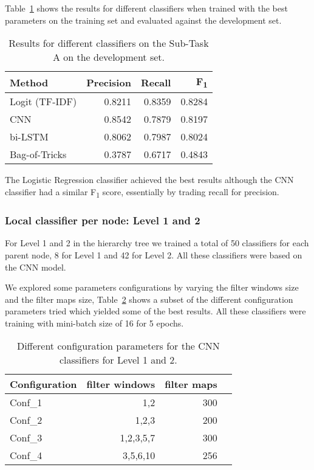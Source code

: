 \documentclass[11pt,a4paper]{article}
\begin{document}
Table~\ref{subtask_a_devset-results} shows the results for different classifiers
when trained with the best parameters on the training set and evaluated against
the development set.

\begin{table}[!h]
\begin{center}
\begin{tabular}{|l|r|r|r|}
\hline\centering\textbf{Method}  & \textbf{Precision} &  \textbf{Recall} &  \textbf{F\textsubscript{1}}\\
\hline
 Logit (TF-IDF) & 0.8211 & 0.8359 & 0.8284 \\
 CNN            & 0.8542 & 0.7879 & 0.8197 \\
 bi-LSTM        & 0.8062 & 0.7987 & 0.8024 \\
 Bag-of-Tricks  & 0.3787 & 0.6717 & 0.4843 \\
\hline
\end{tabular}
\end{center}
\caption{\label{subtask_a_devset-results} Results for different classifiers on the Sub-Task A on the development set.}
\end{table}

The Logistic Regression classifier achieved the best results
although the CNN classifier  had a similar F\textsubscript{1} score, essentially
by trading recall for precision.


\subsubsection{Local classifier per node: Level 1 and 2}

For Level 1 and 2 in the hierarchy tree we trained a total of 50 classifiers
for each parent node, 8 for Level 1 and 42 for Level 2. All these classifiers
were based on the CNN model.

We explored some parameters configurations by varying the filter windows size and
the filter maps size, Table~\ref{subtask_b_parameters} shows a subset of the different
configuration parameters tried which yielded some of the best results. All these
classifiers were training with mini-batch size of 16 for 5 epochs.

\begin{table}[!h]
\begin{center}
\begin{tabular}{|l|r|r|r|}
\hline\centering\textbf{Configuration}  & \textbf{filter windows} &  \textbf{filter maps} \\
\hline
 Conf\_1 & 1,2       & 300 \\
 Conf\_2 & 1,2,3     & 200 \\
 Conf\_3 & 1,2,3,5,7 & 300 \\
 Conf\_4 & 3,5,6,10  & 256 \\
\hline
\end{tabular}
\end{center}
\caption{\label{subtask_b_parameters} Different configuration parameters for the CNN classifiers for Level 1 and 2.}
\end{table}
\end{document}
